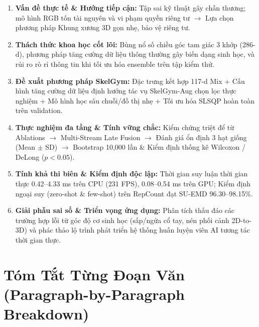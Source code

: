 \documentclass[10pt,a4paper]{article}
\begin{document}
\begin{takeawaybox}
\begin{enumerate}[leftmargin=*, itemsep=2.5pt, topsep=1pt, label=\textcolor{accentGreen}{\textbf{Giai đoạn \arabic*:}}]
    \item \textbf{Vấn đề thực tế \& Hướng tiếp cận:} Tập sai kỹ thuật gây chấn thương; mô hình RGB tốn tài nguyên và vi phạm quyền riêng tư $\longrightarrow$ Lựa chọn phương pháp Khung xương 3D gọn nhẹ, bảo vệ riêng tư.
    \item \textbf{Thách thức khoa học cốt lõi:} Bùng nổ số chiều góc tam giác 3 khớp (286-d), phương pháp tăng cường dữ liệu thông thường gây biến dạng sinh học, và rủi ro rò rỉ thông tin khi tối ưu hóa ensemble trên tập kiểm thử.
    \item \textbf{Đề xuất phương pháp SkelGym:} Đặc trưng kết hợp 117-d Mix + Cấu hình tăng cường dữ liệu định hướng tác vụ SkelGym-Aug chọn lọc thực nghiệm + Mô hình học sâu chuỗi/đồ thị nhẹ + Tối ưu hóa SLSQP hoàn toàn trên validation.
    \item \textbf{Thực nghiệm đa tầng \& Tính vững chắc:} Kiểm chứng triệt để từ Ablations $\to$ Multi-Stream Late Fusion $\to$ Đánh giá ổn định 3 hạt giống (Mean $\pm$ SD) $\to$ Bootstrap 10,000 lần \& Kiểm định thống kê Wilcoxon / DeLong ($p < 0.05$).
    \item \textbf{Tính khả thi biên \& Kiểm định độc lập:} Thời gian suy luận thời gian thực 0.42--4.33 ms trên CPU (231 FPS), 0.08--0.54 ms trên GPU; Kiểm định ngoại suy (zero-shot \& few-shot) trên RepCount đạt SU-EMD 96.30--98.15\%.
    \item \textbf{Giải phẫu sai số \& Triển vọng ứng dụng:} Phân tích thấu đáo các trường hợp lỗi từ góc độ cơ sinh học (sấp/ngửa cổ tay, nén phối cảnh 2D-to-3D) và phác thảo lộ trình phát triển hệ thống huấn luyện viên AI tương tác thời gian thực.
\end{enumerate}
\end{takeawaybox}

\vspace{4pt}

\section{Tóm Tắt Từng Đoạn Văn (Paragraph-by-Paragraph Breakdown)}
\end{document}
